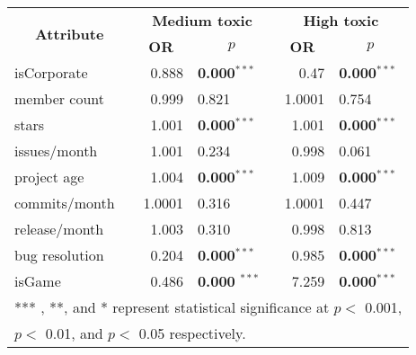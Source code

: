 
\begin{tabular}{l|r|l|r|l}
\hline
\multicolumn{1}{c|}{\multirow{2}{*}{\textbf{Attribute}}} & \multicolumn{2}{c|}{\textbf{Medium toxic}} & \multicolumn{2}{c}{\textbf{High toxic}} \\ \cline{2-5} 
\multicolumn{1}{c|}{}   & \multicolumn{1}{c|}{\textbf{OR}}    & \multicolumn{1}{c|}{\textbf{$p$}}   & \multicolumn{1}{c|}{\textbf{OR}}                                 & \multicolumn{1}{c}{\textbf{$p$}}   \\ \hline

isCorporate  & 0.888 & \textbf{0.000}$^{***}$ & 0.47 & \textbf{0.000}$^{***}$ \\  \hline
member count   & 0.999 & 0.821 & 1.0001 & 0.754  \\  \hline
stars & 1.001 & \textbf{0.000}$^{***}$ & 1.001 & \textbf{0.000}$^{***}$ \\  \hline
issues/month & 1.001 & 0.234 & 0.998 & 0.061 \\  \hline
project age &  1.004 & \textbf{0.000}$^{***}$ & 1.009 & \textbf{0.000}$^{***}$ \\  \hline
commits/month & 1.0001 & 0.316 & 1.0001 & 0.447 \\  \hline
release/month   & 1.003 & 0.310 & 0.998 & 0.813  \\  \hline
bug resolution   & 0.204 & \textbf{0.000}$^{***}$ & 0.985 & \textbf{0.000}$^{***}$ \\  \hline

isGame   &  0.486 & \textbf{0.000 }$^{***}$ &  7.259 & \textbf{0.000}$^{***}$ \\  \hline

\multicolumn{5}{l}{*** , **, and *  represent statistical significance at $p <$ 0.001, }\\

\multicolumn{5}{l}{ $p <$ 0.01, and $p <$ 0.05 respectively.}

\end{tabular}
